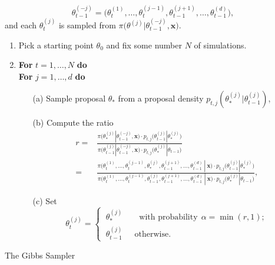 \begin{equation*}
\theta_{t-1}^{(-j)}=\Big(\theta_t^{(1)},\dots,\theta_t^{(j-1)},\theta_{t-1}^{(j+1)},\dots,\theta_{t-1}^{(d)}\Big),
\end{equation*} 
and each $\theta_t^{(j)}$ is sampled from $\pi\Big(\theta^{(j)}|\theta_{t-1}^{(-j)},\boldsymbol{x}\Big)$. 

\begin{algorithm}[H]
	\SetAlgoLined
	\begin{enumerate}
		\item Pick a starting point $\theta_0$ and fix some number $N$ of simulations.
		\item \textbf{For} $t=1,\dots,N$ \qquad \textbf{do} \\
		\quad \textbf{For} $j=1,\dots,d$ \qquad \textbf{do}
		\begin{itemize}
			\item[(a)] Sample proposal $\theta_*$ from a proposal density $p_{t,j}(\theta^{(j)}_*|\theta^{(j)}_{t-1})$,
			\item[(b)] Compute the ratio
			\begin{equation}\label{eq:gibalgo}
			\begin{aligned}
				r = & \frac{\pi\Big(\theta^{(j)}_*|\theta_{t-1}^{(-j)},\boldsymbol{x}\Big)\cdot p_{t,j}\Big(\theta^{(j)}_{t-1}|\theta^{(j)}_*\Big)}{\pi\Big(\theta_{t-1}^{(j)}|\theta_{t-1}^{(-j)},\boldsymbol{x}\Big)\cdot p_{t,j}\Big(\theta^{(j)}_*|\theta_{t-1}\Big)} \\
				= & \frac{\pi\Big(\theta_t^{(1)},\dots,\theta_t^{(j-1)},\theta^{(j)}_*, \theta_{t-1}^{(j+1)},\dots,\theta_{t-1}^{(d)} \ | \ \boldsymbol{x}\Big)\cdot  p_{t,j}\Big(\theta_{t-1}^{(j)}|\theta_*^{(j)}\Big)}{\pi\Big(\theta_t^{(1)},\dots,\theta_t^{(j-1)},\theta^{(j)}_{t-1}, \theta_{t-1}^{(j+1)},\dots,\theta_{t-1}^{(d)}\ |\ \boldsymbol{x}\Big)\cdot  p_{t,j}\Big(\theta_{*}^{(j)}|\theta_{t-1}\Big)},
		\end{aligned}
			\end{equation}
			\item[(c)] Set 
			\begin{equation*}
			\theta_t^{(j)}= 			\begin{cases} \ \theta_*^{(j)} \qquad \text{with probability} \ \  \alpha=\min (r,1); \\
			\ \theta_{t-1}^{(j)} \ \ \quad \text{otherwise}.
			\end{cases}
			\end{equation*}
		\end{itemize}
	\end{enumerate}
	\caption{The Gibbs Sampler}\label{algo:gib}
\end{algorithm}

